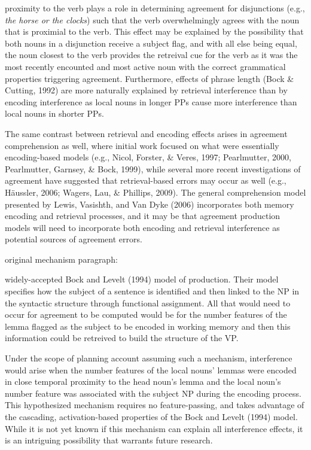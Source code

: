 \documentclass[12pt,titlepage]{article}
\newcommand{\itt}{\textit}  %
\begin{document}
{proximity to the verb plays a role in determining agreement for
disjunctions (e.g., \itt{the horse or the clocks}) such that the verb
overwhelmingly agrees with the noun that is proximial to the verb.  This
effect may be explained by the possibility that both nouns in a disjunction
receive a subject flag, and with all else being equal, the noun closest to
the verb provides the retreival cue for the verb as it was the most
recently encounted and most active noun with the correct grammatical
properties triggering agreement.  Furthermore, effects of phrase length
(Bock \& Cutting, 1992) are more naturally explained by retrieval
interference than by encoding interference as local nouns in longer PPs
cause more interference than local nouns in shorter PPs.

The same contrast between retrieval and encoding effects arises in
agreement comprehension as well, where initial work focused on what were
essentially encoding-based models (e.g., Nicol, Forster, \& Veres, 1997;
Pearlmutter, 2000, Pearlmutter, Garnsey, \& Bock, 1999), while several more
recent investigations of agreement have suggested that retrieval-based
errors may occur as well (e.g., H\"{a}ussler, 2006; Wagers, Lau, \&
Phillips, 2009).  The general comprehension model presented by Lewis,
Vasishth, and Van Dyke (2006) incorporates both memory encoding and
retrieval processes, and it may be that agreement production models will
need to incorporate both encoding and retrieval interference as potential
sources of agreement errors.


original mechanism paragraph:

widely-accepted Bock and Levelt (1994) model of production.  Their model
specifies how the subject of a sentence is identified and then linked to
the NP in the syntactic structure through functional assignment.  All that
would need to occur for agreement to be computed would be for the number
features of the lemma flagged as the subject to be encoded in working
memory and then this information could be retreived to build the structure
of the VP.

Under the scope of planning account assuming such a mechanism, interference
would arise when the number features of the local nouns' lemmas were
encoded in close temporal proximity to the head noun's lemma and the local
noun's number feature was associated with the subject NP during the
encoding process.  This hypothesized mechanism requires no feature-passing,
and takes advantage of the cascading, activation-based properties of the
Bock and Levelt (1994) model.  While it is not yet known if this mechanism
can explain all interference effects, it is an intriguing possibility that
warrants future research.

}
\end{document}
